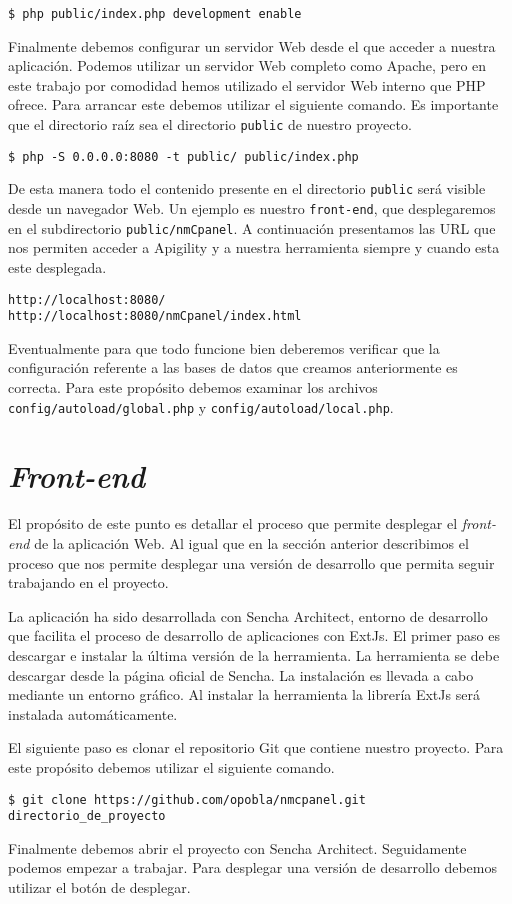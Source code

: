	\begin{lstlisting}[style=myBash]
$ php public/index.php development enable
	\end{lstlisting}
	Finalmente debemos configurar un servidor Web desde el que acceder a nuestra aplicación. Podemos utilizar un servidor Web completo como
	Apache, pero en este trabajo por comodidad hemos utilizado el servidor Web interno que PHP ofrece. Para arrancar este debemos utilizar el
	siguiente comando. Es importante que  el directorio raíz sea el directorio \texttt{public} de nuestro proyecto.
	\begin{lstlisting}[style=myBash]
$ php -S 0.0.0.0:8080 -t public/ public/index.php
	\end{lstlisting}
	De esta manera todo el contenido presente en el directorio \texttt{public} será visible desde un navegador Web. Un ejemplo es nuestro
	\texttt{front-end}, que desplegaremos en el subdirectorio \texttt{public/nmCpanel}. A continuación presentamos las URL que nos permiten
	acceder a Apigility y a nuestra herramienta siempre y cuando esta este desplegada.
	\begin{lstlisting}[style=myFile]
http://localhost:8080/
http://localhost:8080/nmCpanel/index.html
	\end{lstlisting}
	Eventualmente para que todo funcione bien deberemos verificar que la configuración referente a las bases de datos que creamos anteriormente es
	correcta. Para este propósito debemos examinar los archivos \texttt{config/autoload/global.php} y \texttt{config/autoload/local.php}.

\section{\emph{Front-end}}
	\label{app_front}
	El propósito de este punto es detallar el proceso que permite desplegar el \emph{front-end} de la aplicación Web. Al igual que en la sección
	anterior describimos el proceso que nos permite desplegar una versión de desarrollo que permita seguir trabajando en el proyecto.
	\par
	La aplicación ha sido desarrollada con Sencha Architect, entorno de desarrollo que facilita el proceso de desarrollo de aplicaciones con
	ExtJs. El primer paso es descargar e instalar la última versión de la herramienta. La herramienta se debe descargar desde la página oficial de
	Sencha. La instalación es llevada a cabo mediante un entorno gráfico. Al instalar la herramienta la librería ExtJs será instalada
	automáticamente.
	\par
	El siguiente paso es clonar el repositorio Git que contiene nuestro proyecto. Para este propósito debemos utilizar el siguiente comando.
	\begin{lstlisting}[style=myBash]
$ git clone https://github.com/opobla/nmcpanel.git directorio_de_proyecto
	\end{lstlisting}
	Finalmente debemos abrir el proyecto con Sencha Architect.  Seguidamente podemos empezar a trabajar. Para desplegar una versión de desarrollo
	debemos utilizar el botón de desplegar.

